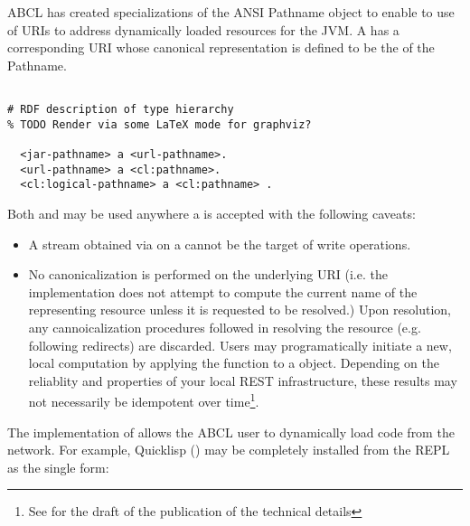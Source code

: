 \documentclass[10pt]{book}
\begin{document}
\textsc{ABCL} has created specializations of the ANSI Pathname object to
enable to use of \textsc{URI}s to address dynamically loaded resources for the
JVM.  A  has a corresponding \textsc{URI} whose canonical
representation is defined to be the  of the Pathname.

%
\begin{verbatim}

# RDF description of type hierarchy 
% TODO Render via some LaTeX mode for graphviz?

  <jar-pathname> a <url-pathname>.
  <url-pathname> a <cl:pathname>.
  <cl:logical-pathname> a <cl:pathname> .
\end{verbatim}

\label{EXTENSIONS:URL-PATHNAME}

\label{EXTENSIONS:JAR-PATHNAME}

Both  and  may be used anywhere
a  is accepted with the following caveats:

\begin{itemize}

\item A stream obtained via  on a 
  cannot be the target of write operations.

\item No canonicalization is performed on the underlying \textsc{URI}
  (i.e. the implementation does not attempt to compute the current
  name of the representing resource unless it is requested to be
  resolved.)  Upon resolution, any cannoicalization procedures
  followed in resolving the resource (e.g. following redirects) are
  discarded.  Users may programatically initiate a new, local
  computation by applying the  function to a
   object.  Depending on the reliablity and
  properties of your local \textsc{REST} infrastructure, these results
  may not necessarily be idempotent over time\footnote {See
  \cite{evenson2011} for the draft of the publication of the technical
  details}.

\end{itemize}

The implementation of  allows the \textsc{ABCL}
user to dynamically load code from the network.  For example,
Quicklisp (\cite{quicklisp}) may be completely installed from the REPL
as the single form:
\end{document}
